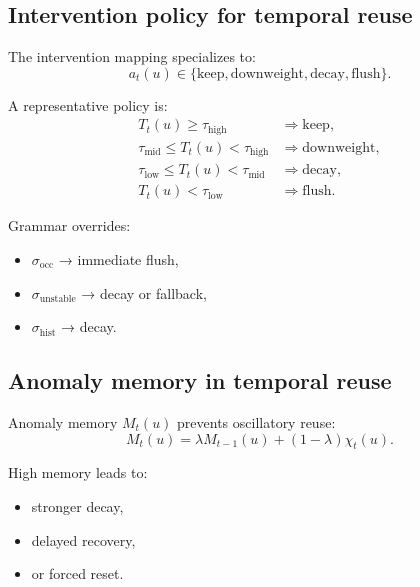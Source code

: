 \documentclass[11pt,letterpaper]{article}
\theoremstyle{gcresult}
\theoremstyle{definition}
\begin{document}

\subsection{Intervention policy for temporal reuse}

The intervention mapping specializes to:
\begin{equation}
a_t(u)\in\{\mathrm{keep},\mathrm{downweight},\mathrm{decay},\mathrm{flush}\}.
\end{equation}

A representative policy is:
\begin{align}
T_t(u)\ge \tau_{\mathrm{high}} &\Rightarrow \mathrm{keep},\\
\tau_{\mathrm{mid}}\le T_t(u)<\tau_{\mathrm{high}} &\Rightarrow \mathrm{downweight},\\
\tau_{\mathrm{low}}\le T_t(u)<\tau_{\mathrm{mid}} &\Rightarrow \mathrm{decay},\\
T_t(u)<\tau_{\mathrm{low}} &\Rightarrow \mathrm{flush}.
\end{align}

Grammar overrides:
\begin{itemize}[leftmargin=1.5em]
    \item $\sigma_{\mathrm{occ}}$ → immediate flush,
    \item $\sigma_{\mathrm{unstable}}$ → decay or fallback,
    \item $\sigma_{\mathrm{hist}}$ → decay.
\end{itemize}


\subsection{Anomaly memory in temporal reuse}

Anomaly memory $M_t(u)$ prevents oscillatory reuse:
\begin{equation}
M_t(u)=\lambda M_{t-1}(u)+(1-\lambda)\chi_t(u).
\end{equation}

High memory leads to:
\begin{itemize}[leftmargin=1.5em]
    \item stronger decay,
    \item delayed recovery,
    \item or forced reset.
\end{itemize}
\end{document}
